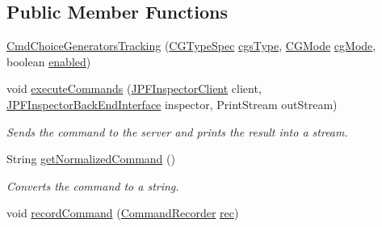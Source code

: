 \subsection*{Public Member Functions}
\begin{DoxyCompactItemize}
\item 
\hyperlink{classgov_1_1nasa_1_1jpf_1_1inspector_1_1client_1_1commands_1_1_cmd_choice_generators_tracking_ac8342c325fce7d075a1f21e4a7c6f8f5}{Cmd\+Choice\+Generators\+Tracking} (\hyperlink{enumgov_1_1nasa_1_1jpf_1_1inspector_1_1client_1_1commands_1_1_cmd_choice_generators_tracking_1_1_c_g_type_spec}{C\+G\+Type\+Spec} \hyperlink{classgov_1_1nasa_1_1jpf_1_1inspector_1_1client_1_1commands_1_1_cmd_choice_generators_tracking_a407320f69637c99aa4a82d78cfc5ae07}{cgs\+Type}, \hyperlink{enumgov_1_1nasa_1_1jpf_1_1inspector_1_1interfaces_1_1_choice_generators_interface_1_1_c_g_mode}{C\+G\+Mode} \hyperlink{classgov_1_1nasa_1_1jpf_1_1inspector_1_1client_1_1commands_1_1_cmd_choice_generators_tracking_ab6410ab4d33fab56087f59dbd898824b}{cg\+Mode}, boolean \hyperlink{classgov_1_1nasa_1_1jpf_1_1inspector_1_1client_1_1commands_1_1_cmd_choice_generators_tracking_a71cada56aa7d86442e42fa24303eadaa}{enabled})
\item 
void \hyperlink{classgov_1_1nasa_1_1jpf_1_1inspector_1_1client_1_1commands_1_1_cmd_choice_generators_tracking_ac028714a7b8e411a221a1166036bde26}{execute\+Commands} (\hyperlink{classgov_1_1nasa_1_1jpf_1_1inspector_1_1client_1_1_j_p_f_inspector_client}{J\+P\+F\+Inspector\+Client} client, \hyperlink{interfacegov_1_1nasa_1_1jpf_1_1inspector_1_1interfaces_1_1_j_p_f_inspector_back_end_interface}{J\+P\+F\+Inspector\+Back\+End\+Interface} inspector, Print\+Stream out\+Stream)
\begin{DoxyCompactList}\small\item\em Sends the command to the server and prints the result into a stream. \end{DoxyCompactList}\item 
String \hyperlink{classgov_1_1nasa_1_1jpf_1_1inspector_1_1client_1_1commands_1_1_cmd_choice_generators_tracking_ab2edb3b8361ce3bdfdfffef87189a846}{get\+Normalized\+Command} ()
\begin{DoxyCompactList}\small\item\em Converts the command to a string. \end{DoxyCompactList}\item 
void \hyperlink{classgov_1_1nasa_1_1jpf_1_1inspector_1_1client_1_1_client_command_ae0670332ec750bc5b9016d0b04d8adfe}{record\+Command} (\hyperlink{classgov_1_1nasa_1_1jpf_1_1inspector_1_1client_1_1_command_recorder}{Command\+Recorder} \hyperlink{classgov_1_1nasa_1_1jpf_1_1inspector_1_1client_1_1_client_command_af4246f2427035c72a6af45a2c61361f7}{rec})

\end{DoxyCompactItemize}

